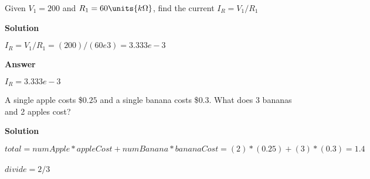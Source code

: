 
\question Given $\mbox{$V_{1}=200$}$  and \mbox{$R_{1}=\mbox{$60 \units{k \Omega}$}$}, find the current  $I_R = V_1/R_1$


\begin{solutions}
\textbf{Solution}

\mbox{$I_{R}=V_{1}/R_{1}  = (200)/(60e3) = 3.333e-3$}\\
\end{solutions}


\begin{answers}
\textbf{Answer}

\mbox{$I_{R}=3.333e-3$}
\end{answers}


\question A single apple costs \$$0.25$ and a single banana costs \$$0.3$.  What does 3 bananas and 
2 apples cost?

\begin{solutions}
\textbf{Solution}

\mbox{$total = numApple*appleCost+numBanana*bananaCost  =  (2)*(0.25)+(3)*(0.3) = 1.4$}\\
\\
\mbox{$divide = 2/3 $}\\
\\
\end{solutions}


